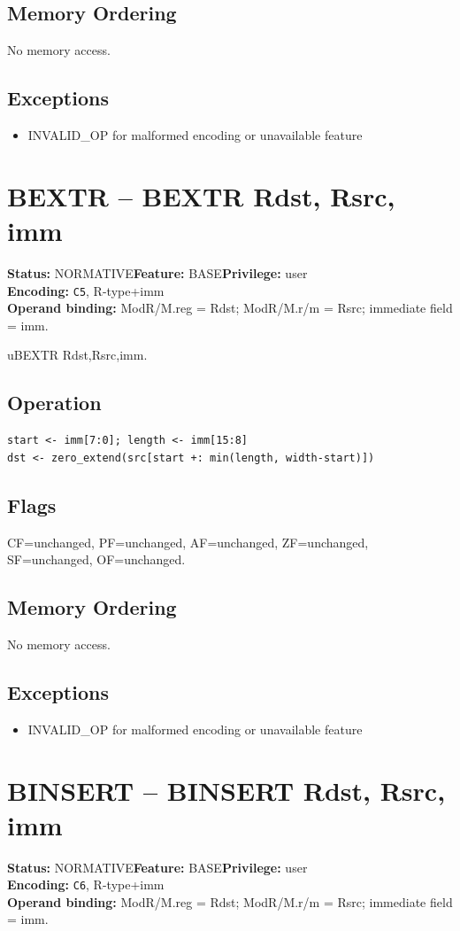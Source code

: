 \documentclass[10pt]{article}
\begin{document}
\subsection*{Memory Ordering}
No memory access.
\subsection*{Exceptions}
\begin{itemize}
\item INVALID\_OP for malformed encoding or unavailable feature
\end{itemize}
\clearpage

\section{BEXTR -- BEXTR Rdst, Rsrc, imm}
\textbf{Status:} NORMATIVE\quad \textbf{Feature:} BASE\quad \textbf{Privilege:} user\\
\textbf{Encoding:} \texttt{C5}, R-type+imm\\
\textbf{Operand binding:} ModR/M.reg = Rdst; ModR/M.r/m = Rsrc; immediate field = imm.

uBEXTR Rdst,Rsrc,imm.

\subsection*{Operation}
\begin{lstlisting}
start <- imm[7:0]; length <- imm[15:8]
dst <- zero_extend(src[start +: min(length, width-start)])
\end{lstlisting}
\subsection*{Flags}
CF=unchanged, PF=unchanged, AF=unchanged, ZF=unchanged, SF=unchanged, OF=unchanged.
\subsection*{Memory Ordering}
No memory access.
\subsection*{Exceptions}
\begin{itemize}
\item INVALID\_OP for malformed encoding or unavailable feature
\end{itemize}
\clearpage

\section{BINSERT -- BINSERT Rdst, Rsrc, imm}
\textbf{Status:} NORMATIVE\quad \textbf{Feature:} BASE\quad \textbf{Privilege:} user\\
\textbf{Encoding:} \texttt{C6}, R-type+imm\\
\textbf{Operand binding:} ModR/M.reg = Rdst; ModR/M.r/m = Rsrc; immediate field = imm.
\end{document}
